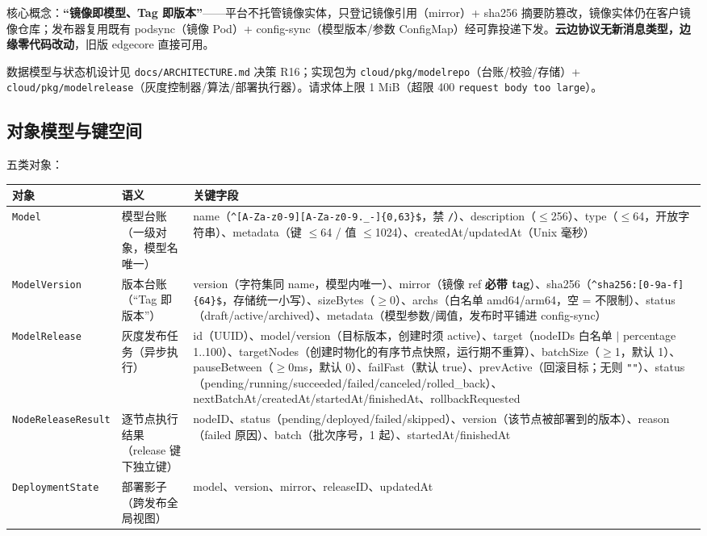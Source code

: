 核心概念：\textbf{“镜像即模型、Tag 即版本”}——平台不托管镜像实体，只登记镜像引用（mirror）+ sha256 摘要防篡改，镜像实体仍在客户镜像仓库；发布器复用既有 podsync（镜像 Pod）+ config-sync（模型版本/参数 ConfigMap）经可靠投递下发。\textbf{云边协议无新消息类型，边缘零代码改动}，旧版 edgecore 直接可用。

数据模型与状态机设计见 \texttt{docs/ARCHITECTURE.md} 决策 R16；实现包为 \texttt{cloud/pkg/modelrepo}（台账/校验/存储）+ \texttt{cloud/pkg/modelrelease}（灰度控制器/算法/部署执行器）。请求体上限 1 MiB（超限 400 \texttt{request body too large}）。

\subsection{对象模型与键空间}

五类对象：

\begin{tabularx}{\textwidth}{l l X}
  \toprule
  \textbf{对象} & \textbf{语义} & \textbf{关键字段} \\
  \midrule
  \texttt{Model} & 模型台账（一级对象，模型名唯一） & name（\verb|^[A-Za-z0-9][A-Za-z0-9._-]{0,63}$|，禁 \texttt{/}）、description（$\leq$256）、type（$\leq$64，开放字符串）、metadata（键 $\leq$64 / 值 $\leq$1024）、createdAt/updatedAt（Unix 毫秒） \\
  \texttt{ModelVersion} & 版本台账（“Tag 即版本”） & version（字符集同 name，模型内唯一）、mirror（镜像 ref \textbf{必带 tag}）、sha256（\verb|^sha256:[0-9a-f]{64}$|，存储统一小写）、sizeBytes（$\geq$0）、archs（白名单 amd64/arm64，空 = 不限制）、status（draft/active/archived）、metadata（模型参数/阈值，发布时平铺进 config-sync） \\
  \texttt{ModelRelease} & 灰度发布任务（异步执行） & id（UUID）、model/version（目标版本，创建时须 active）、target（nodeIDs 白名单 $|$ percentage 1..100）、targetNodes（创建时物化的有序节点快照，运行期不重算）、batchSize（$\geq$1，默认 1）、pauseBetween（$\geq$0ms，默认 0）、failFast（默认 true）、prevActive（回滚目标；无则 \texttt{""}）、status（pending/running/succeeded/failed/canceled/rolled\_back）、nextBatchAt/createdAt/startedAt/finishedAt、rollbackRequested \\
  \texttt{NodeReleaseResult} & 逐节点执行结果（release 键下独立键） & nodeID、status（pending/deployed/failed/skipped）、version（该节点被部署到的版本）、reason（failed 原因）、batch（批次序号，1 起）、startedAt/finishedAt \\
  \texttt{DeploymentState} & 部署影子（跨发布全局视图） & model、version、mirror、releaseID、updatedAt \\
  \bottomrule
\end{tabularx}

